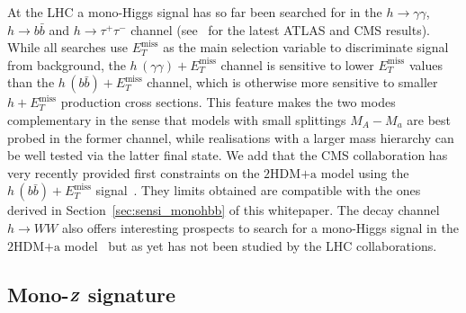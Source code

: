 \documentclass[a4paper, 11pt,notoc]{article}
\newcommand{\MET}{\ensuremath{E_T^\mathrm{miss}}\xspace}
\newcommand{\mA}{\ensuremath{M_{A}}\xspace}
\newcommand{\ma}{\ensuremath{M_{a}}\xspace}
\newcommand{\hdma}{\ensuremath{\textrm{2HDM+a}}\xspace}
\def\bm#1{\mbox{\boldmath$#1$\unboldmath}}
\begin{document}
{\color{red} At the LHC a mono-Higgs signal has so far been searched for in the $h \to \gamma \gamma$, $h \to b \bar b$ and $h \to \tau^+ \tau^-$ channel (see~\cite{Aaboud:2017uak,ATLAS-CONF-2018-039,CMS-PAS-EXO-16-050,CMS:2018yme}  for the latest ATLAS and CMS results).  While all searches use $\MET$ as the main selection variable to discriminate signal from background,  the  $h \, (\gamma \gamma) + \MET$  channel  is sensitive to lower $\MET$ values than the $h \, (b \bar b) + \MET$  channel, which is otherwise more sensitive to smaller $h + \MET$ production cross sections. }  {\color{blue} This feature makes the two modes complementary in the sense that  models with  small  splittings $\mA - \ma$ are best probed in the former channel, while realisations with a larger mass hierarchy can be well tested via the latter final state.} {\color{green} We add that the CMS collaboration has very recently provided first constraints on the \hdma model using the $h \, (b \bar b) + \MET$ signal~\cite{CMS-PAS-EXO-16-050}. They limits obtained are compatible with the ones derived in Section~\ref{sec:sensi_monohbb} of this whitepaper.} The decay channel~$h \to WW$ also offers interesting prospects to search for a mono-Higgs signal in the \hdma model~\cite{GPHeidelberg} but as yet has not been studied by the LHC collaborations.  

\subsection*{Mono-$\bm{Z}$ signature}
\end{document}
